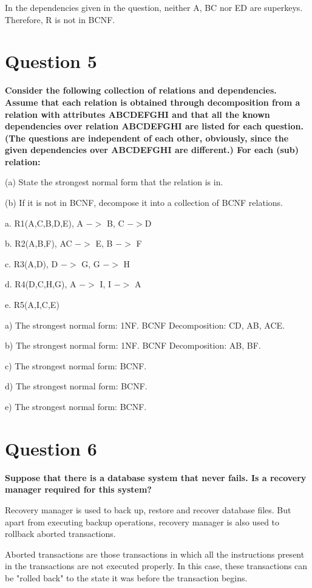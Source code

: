 \documentclass[12pt]{article}
\begin{document}
In the dependencies given in the question, neither A, BC nor ED are superkeys. Therefore, R is not in BCNF.

\section*{Question 5}
{\bfseries Consider the following collection of relations and dependencies. Assume that each relation is obtained through decomposition from a relation with attributes ABCDEFGHI and that all the known dependencies over relation ABCDEFGHI are listed for each question. (The questions are independent of each other, obviously, since the given dependencies over ABCDEFGHI are different.) For each (sub) relation: 

(a) State the strongest normal form that
the relation is in. 

(b) If it is not in BCNF, decompose it into a collection of
BCNF relations. 

a. R1(A,C,B,D,E), A $->$ B, C $->$D

b. R2(A,B,F), AC $->$ E, B $->$ F

c. R3(A,D), D $->$ G, G $->$ H

d. R4(D,C,H,G), A $->$ I, I $->$ A

e. R5(A,I,C,E)}

a) The strongest normal form: 1NF. BCNF Decomposition: CD, AB, ACE.

b) The strongest normal form: 1NF. BCNF Decomposition: AB, BF.

c) The strongest normal form: BCNF.

d) The strongest normal form: BCNF.

e) The strongest normal form: BCNF.

\section*{Question 6}
{\bfseries Suppose that there is a database system that never fails. Is a recovery manager required for this system?}

Recovery manager is used to back up, restore and recover database files. But apart from executing backup operations, recovery manager is also used to rollback aborted transactions.

Aborted transactions are those transactions in which all the instructions present in the transactions are not executed properly. In this case, these transactions can be "rolled back" to the state it was before the transaction begins.
\end{document}
